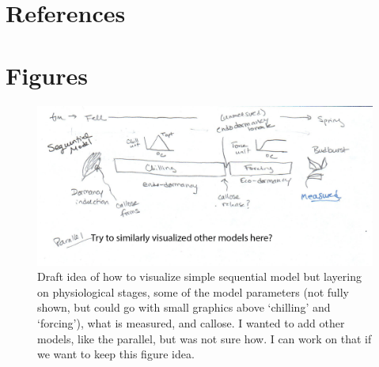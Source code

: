 \documentclass[11pt]{article}
\begin{document}
\clearpage

\section{References}



\clearpage
\section{Figures}

\begin{figure}[h!]
\includegraphics[width=1\textwidth]{..//figures/chillingmodel_drafttext.png}
\caption{Draft idea of how to visualize simple sequential model but layering on physiological stages, some of the model parameters (not fully shown, but could go with small graphics above `chilling' and `forcing'), what is measured, and callose. I wanted to add other models, like the parallel, but was not sure how. I can work on that if we want to keep this figure idea.} 
\label{fig:modelsketch}
\end{figure}
\end{document}
